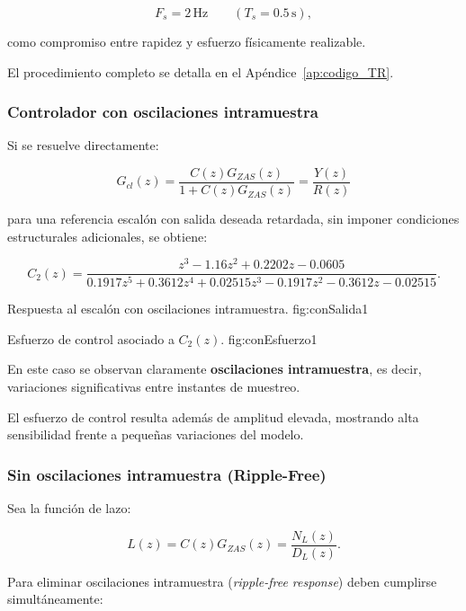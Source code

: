 \[
F_s = 2\,\text{Hz}
\qquad
(T_s = 0.5\,\text{s}),
\]

como compromiso entre rapidez y esfuerzo físicamente realizable.

El procedimiento completo se detalla en el
Apéndice~\ref{ap:codigo_TR}.

\subsubsection{Controlador con oscilaciones intramuestra}

Si se resuelve directamente:

\[
G_{cl}(z)
=
\frac{C(z)G_{ZAS}(z)}{1+C(z)G_{ZAS}(z)}
=
\frac{Y(z)}{R(z)}
\]

para una referencia escalón con salida deseada retardada,
sin imponer condiciones estructurales adicionales,
se obtiene:

{\tiny
	\[
	C_2(z)=
	\frac{z^3 - 1.16z^2 + 0.2202z - 0.0605}
	{0.1917z^5 + 0.3612z^4 + 0.02515z^3
		- 0.1917z^2 - 0.3612z - 0.02515}.
	\]
}

{Respuesta al escalón con oscilaciones intramuestra.}
{fig:conSalida}{1}

{Esfuerzo de control asociado a \(C_2(z)\).}
{fig:conEsfuerzo}{1}

En este caso se observan claramente
\textbf{oscilaciones intramuestra}, es decir,
variaciones significativas entre instantes de muestreo.

El esfuerzo de control resulta además de amplitud elevada,
mostrando alta sensibilidad frente a pequeñas variaciones
del modelo.

\subsubsection{Sin oscilaciones intramuestra (Ripple-Free)}

Sea la función de lazo:

\[
L(z) = C(z)G_{ZAS}(z) = \frac{N_L(z)}{D_L(z)}.
\]

Para eliminar oscilaciones intramuestra
(\textit{ripple-free response}) deben cumplirse simultáneamente:

